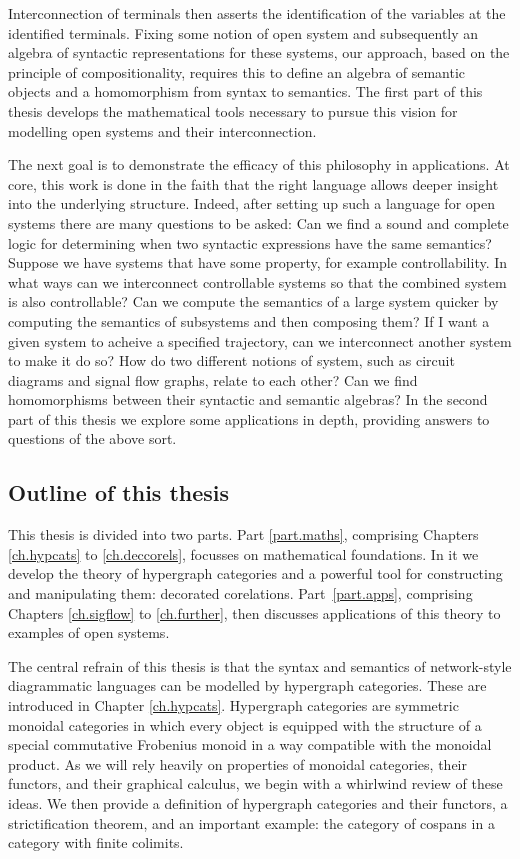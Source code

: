 Interconnection of terminals then asserts the identification of the variables at
the identified terminals. Fixing some notion of open system and subsequently an
algebra of syntactic representations for these systems, our approach, based on
the principle of compositionality, requires this to define an algebra of
semantic objects and a homomorphism from syntax to semantics. The first part of
this thesis develops the mathematical tools necessary to pursue this vision for
modelling open systems and their interconnection. 

The next goal is to demonstrate the efficacy of this philosophy in applications.
At core, this work is done in the faith that the right language allows deeper
insight into the underlying structure. Indeed, after setting up such a language
for open systems there are many questions to be asked: Can we find a sound and
complete logic for determining when two syntactic expressions have the same
semantics? Suppose we have systems that have some property, for example
controllability.  In what ways can we interconnect controllable systems so that
the combined system is also controllable? Can we compute the semantics of a
large system quicker by computing the semantics of subsystems and then composing
them?  If I want a given system to acheive a specified trajectory, can we
interconnect another system to make it do so? How do two different notions of
system, such as circuit diagrams and signal flow graphs, relate to each other?
Can we find homomorphisms between their syntactic and semantic algebras? In the
second part of this thesis we explore some applications in depth, providing
answers to questions of the above sort.


\subsection*{Outline of this thesis}

This thesis is divided into two parts. Part \ref{part.maths}, comprising
Chapters \ref{ch.hypcats} to \ref{ch.deccorels}, focusses on mathematical
foundations. In it we develop the theory of hypergraph categories and a powerful
tool for constructing and manipulating them: decorated corelations.
Part~\ref{part.apps}, comprising Chapters \ref{ch.sigflow} to \ref{ch.further},
then discusses applications of this theory to examples of open systems.

The central refrain of this thesis is that the syntax and semantics of
network-style diagrammatic languages can be modelled by hypergraph categories.
These are introduced in Chapter \ref{ch.hypcats}. Hypergraph categories are
symmetric monoidal categories in which every object is equipped with the
structure of a special commutative Frobenius monoid in a way compatible with the
monoidal product. As we will rely heavily on properties of monoidal categories,
their functors, and their graphical calculus, we begin with a whirlwind review
of these ideas. We then provide a definition of hypergraph categories and their
functors, a strictification theorem, and an important example: the category of
cospans in a category with finite colimits.

